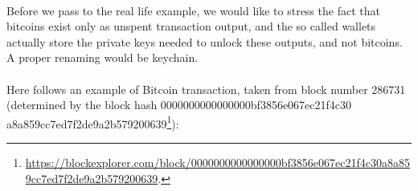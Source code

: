 \\
Before we pass to the real life example, we would like to stress the fact that bitcoins exist only as unspent transaction output, and the so called wallets actually store the private keys needed to unlock these outputs, and not bitcoins. A proper renaming would be keychain.
\\
\\
Here follows an example of Bitcoin transaction, taken from block number 286731 (determined by the block hash 0000000000000000bf3856e067ec21f4c30 a8a859cc7ed7f2de9a2b579200639\footnote{\url{https://blockexplorer.com/block/0000000000000000bf3856e067ec21f4c30a8a859cc7ed7f2de9a2b579200639}.}):


\lstset{style=mystyle}

